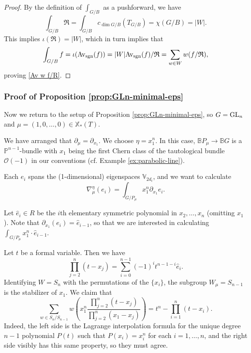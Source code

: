 \documentclass[reqno]{amsart}
\numberwithin{equation}{subsection}
\theoremstyle{definition}
\def\BB{\mathbb{B}}
\def\PP{\mathbb{P}}
\def\VV{\mathbb{V}}
\newcommand\cO{\mathcal{O}}
\newcommand\frR{\mathfrak{R}}
\newcommand\Av{\textup{Av}}
\newcommand\sgn{\textup{sgn}}
\newcommand\GL{\textup{GL}}
\newcommand\xcoch{\mathbb{X}_*}
\newcommand{\wh}[1]{\widehat{#1}}
\newcommand{\io}{\iota}
\newcommand\nb{\nabla}
\newcommand\pl{\partial}
\begin{document}
\begin{proof}
By the definition of $\int_{G/B}$ as a pushforward, we have
\begin{equation*}
\int_{G/B}\frR=\int_{G/B}c_{\dim G/B}(T_{G/B})=\chi(G/B)=|W|.
\end{equation*}
This implies $\io(\frR)=|W|$, which in turn implies that
\begin{equation*}
\int_{G/B}f=\io(\Av_{\sgn}(f))=|W|\Av_{\sgn}(f)/\frR=\sum_{w\in W} w(f/\frR),
\end{equation*}
proving \eqref{Av w f/R}.
\end{proof}


\subsubsection{Proof of Proposition \ref{prop:GLn-minimal-eps}}\label{sssec:GLn-minimal-eps-proof} Now we return to the setup of Proposition \ref{prop:GLn-minimal-eps}, so $G = \GL_n$ and $\mu = (1,0, \ldots, 0) \in \xcoch(T)$. 


We have arranged that $\pl_{\mu}=\pl_{x_{1}}$. We choose $\eta = x_1^n$. In this case, $\BB P_\mu \rightarrow \BB G$ is a $\PP^{n-1}$-bundle with $x_1$ being the first Chern class of the tautological bundle $\cO(-1)$ in our conventions (cf. Example \ref{ex:parabolic-line}).

Each $e_i$ spans the (1-dimensional) eigenspaces $\VV_{2d_i}$, and we want to calculate 
\begin{equation*}
\nb_{\mu}^\eta (e_i)= \int_{G/P_\mu} x_1^n \partial_{x_1} e_i.
\end{equation*}

Let $\wh{e}_i \in R$ be the $i$th elementary symmetric polynomial in $x_2, \ldots, x_n$ (omitting $x_1$). Note that $\partial_{x_1} (e_i) = \wh{e}_{i-1}$, so that we are interested in calculating $\int_{G/P_\mu} x_1^n \cdot \wh{e}_{i-1}$. 

Let $t$ be a formal variable. Then we have 
\begin{equation}\label{eq:elementary-symmetric-factorize}
\prod_{j=2}^n (t-x_j) = \sum_{i=0}^{n-1} (-1)^{i} t^{n-1-i} \wh{e}_i .
\end{equation}
Identifying $W = S_n$ with the permutations of the $\{x_i\}$, the subgroup $W_\mu = S_{n-1}$ is the stabilizer of $x_1$. We claim that 
\begin{equation}\label{eq:gln-lagrange-interpolation}
\sum_{w \in S_n/S_{n-1}} w \left(x_1^n \frac{\prod_{j=2}^n (t-x_j)}{\prod_{j=2}^n (x_1-x_j) } \right) =  t^n -  \prod_{i=1}^n (t-x_i).
\end{equation}
Indeed, the left side is the Lagrange interpolation formula for the unique degree $n-1$ polynomial $P(t)$ such that $P(x_i) = x_i^n$ for each $i=1, \ldots, n$, and the right side visibly has this same property, so they must agree. 
\end{document}
